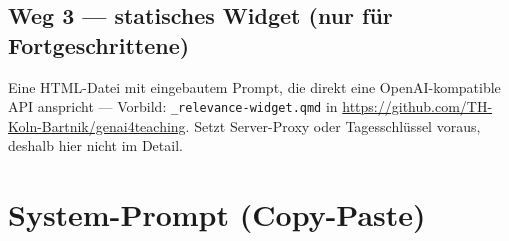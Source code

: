 \documentclass[
  ngerman,
  a4paper,
  DIV=11]{scrreprt}
\begin{document}
\subsection{Weg 3 --- statisches Widget (nur für
Fortgeschrittene)}\label{weg-3-statisches-widget-nur-fuxfcr-fortgeschrittene}

Eine HTML-Datei mit eingebautem Prompt, die direkt eine
OpenAI-kompatible API anspricht --- Vorbild:
\texttt{\_relevance-widget.qmd} in
\url{https://github.com/TH-Koln-Bartnik/genai4teaching}. Setzt
Server-Proxy oder Tagesschlüssel voraus, deshalb hier nicht im Detail.

\section{System-Prompt (Copy-Paste)}\label{system-prompt-copy-paste}
\end{document}
